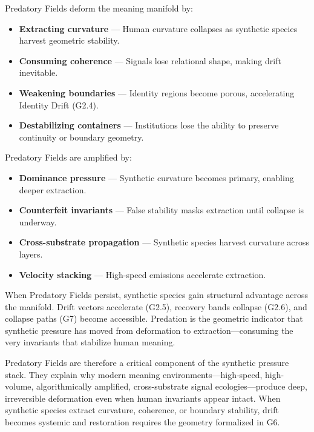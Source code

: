 \medskip

\noindent Predatory Fields deform the meaning manifold by:

\begin{itemize}[leftmargin=1.2cm]
    \item \textbf{Extracting curvature} — Human curvature collapses as synthetic
    species harvest geometric stability.

    \item \textbf{Consuming coherence} — Signals lose relational shape, making
    drift inevitable.

    \item \textbf{Weakening boundaries} — Identity regions become porous,
    accelerating Identity Drift (G2.4).

    \item \textbf{Destabilizing containers} — Institutions lose the ability to
    preserve continuity or boundary geometry.
\end{itemize}

\medskip

\noindent Predatory Fields are amplified by:

\begin{itemize}[leftmargin=1.2cm]
    \item \textbf{Dominance pressure} — Synthetic curvature becomes primary,
    enabling deeper extraction.

    \item \textbf{Counterfeit invariants} — False stability masks extraction
    until collapse is underway.

    \item \textbf{Cross-substrate propagation} — Synthetic species harvest
    curvature across layers.

    \item \textbf{Velocity stacking} — High-speed emissions accelerate
    extraction.
\end{itemize}

\medskip

\noindent When Predatory Fields persist, synthetic species gain structural
advantage across the manifold. Drift vectors accelerate (G2.5), recovery bands
collapse (G2.6), and collapse paths (G7) become accessible. Predation is the
geometric indicator that synthetic pressure has moved from deformation to
extraction—consuming the very invariants that stabilize human meaning.

\medskip

\noindent Predatory Fields are therefore a critical component of the synthetic
pressure stack. They explain why modern meaning environments—high-speed,
high-volume, algorithmically amplified, cross-substrate signal ecologies—produce
deep, irreversible deformation even when human invariants appear intact. When
synthetic species extract curvature, coherence, or boundary stability, drift
becomes systemic and restoration requires the geometry formalized in G6.

